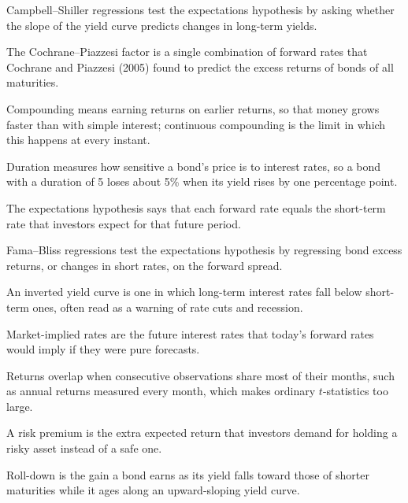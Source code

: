 \begin{keyterms}
\footnotesize
\begin{description}[leftmargin=0pt, itemsep=0pt, parsep=0pt, topsep=0pt, font=\normalfont\bfseries\color{FEMaroon}]
  \item[Campbell--Shiller regressions.] Campbell--Shiller regressions test the expectations hypothesis by asking whether the slope of the yield curve predicts changes in long-term yields.
  \item[Cochrane--Piazzesi factor.] The Cochrane--Piazzesi factor is a single combination of forward rates that Cochrane and Piazzesi (2005) found to predict the excess returns of bonds of all maturities.
  \item[Compounding.] Compounding means earning returns on earlier returns, so that money grows faster than with simple interest; continuous compounding is the limit in which this happens at every instant.
  \item[Duration.] Duration measures how sensitive a bond's price is to interest rates, so a bond with a duration of 5 loses about 5\% when its yield rises by one percentage point.
  \item[Expectations hypothesis.] The expectations hypothesis says that each forward rate equals the short-term rate that investors expect for that future period.
  \item[Fama--Bliss regressions.] Fama--Bliss regressions test the expectations hypothesis by regressing bond excess returns, or changes in short rates, on the forward spread.
  \item[Inverted yield curve.] An inverted yield curve is one in which long-term interest rates fall below short-term ones, often read as a warning of rate cuts and recession.
  \item[Market-implied rates.] Market-implied rates are the future interest rates that today's forward rates would imply if they were pure forecasts.
  \item[Overlapping returns.] Returns overlap when consecutive observations share most of their months, such as annual returns measured every month, which makes ordinary $t$-statistics too large.
  \item[Risk premium.] A risk premium is the extra expected return that investors demand for holding a risky asset instead of a safe one.
  \item[Roll-down.] Roll-down is the gain a bond earns as its yield falls toward those of shorter maturities while it ages along an upward-sloping yield curve.

\end{description}
\end{keyterms}
